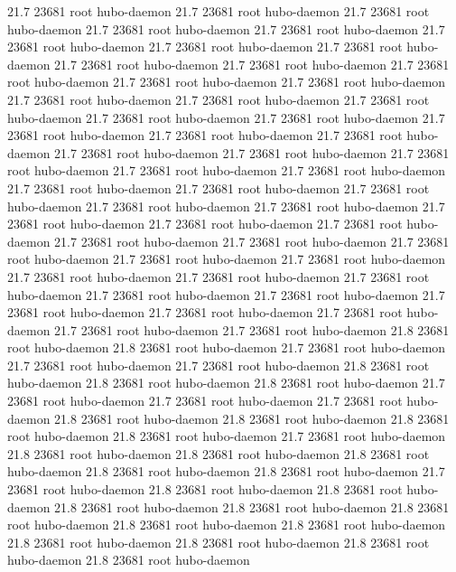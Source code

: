 21.7 23681 root     hubo-daemon
21.7 23681 root     hubo-daemon
21.7 23681 root     hubo-daemon
21.7 23681 root     hubo-daemon
21.7 23681 root     hubo-daemon
21.7 23681 root     hubo-daemon
21.7 23681 root     hubo-daemon
21.7 23681 root     hubo-daemon
21.7 23681 root     hubo-daemon
21.7 23681 root     hubo-daemon
21.7 23681 root     hubo-daemon
21.7 23681 root     hubo-daemon
21.7 23681 root     hubo-daemon
21.7 23681 root     hubo-daemon
21.7 23681 root     hubo-daemon
21.7 23681 root     hubo-daemon
21.7 23681 root     hubo-daemon
21.7 23681 root     hubo-daemon
21.7 23681 root     hubo-daemon
21.7 23681 root     hubo-daemon
21.7 23681 root     hubo-daemon
21.7 23681 root     hubo-daemon
21.7 23681 root     hubo-daemon
21.7 23681 root     hubo-daemon
21.7 23681 root     hubo-daemon
21.7 23681 root     hubo-daemon
21.7 23681 root     hubo-daemon
21.7 23681 root     hubo-daemon
21.7 23681 root     hubo-daemon
21.7 23681 root     hubo-daemon
21.7 23681 root     hubo-daemon
21.7 23681 root     hubo-daemon
21.7 23681 root     hubo-daemon
21.7 23681 root     hubo-daemon
21.7 23681 root     hubo-daemon
21.7 23681 root     hubo-daemon
21.7 23681 root     hubo-daemon
21.7 23681 root     hubo-daemon
21.7 23681 root     hubo-daemon
21.7 23681 root     hubo-daemon
21.7 23681 root     hubo-daemon
21.7 23681 root     hubo-daemon
21.7 23681 root     hubo-daemon
21.7 23681 root     hubo-daemon
21.7 23681 root     hubo-daemon
21.7 23681 root     hubo-daemon
21.7 23681 root     hubo-daemon
21.7 23681 root     hubo-daemon
21.7 23681 root     hubo-daemon
21.8 23681 root     hubo-daemon
21.8 23681 root     hubo-daemon
21.7 23681 root     hubo-daemon
21.7 23681 root     hubo-daemon
21.7 23681 root     hubo-daemon
21.8 23681 root     hubo-daemon
21.8 23681 root     hubo-daemon
21.8 23681 root     hubo-daemon
21.7 23681 root     hubo-daemon
21.7 23681 root     hubo-daemon
21.7 23681 root     hubo-daemon
21.8 23681 root     hubo-daemon
21.8 23681 root     hubo-daemon
21.8 23681 root     hubo-daemon
21.8 23681 root     hubo-daemon
21.7 23681 root     hubo-daemon
21.8 23681 root     hubo-daemon
21.8 23681 root     hubo-daemon
21.8 23681 root     hubo-daemon
21.8 23681 root     hubo-daemon
21.8 23681 root     hubo-daemon
21.7 23681 root     hubo-daemon
21.8 23681 root     hubo-daemon
21.8 23681 root     hubo-daemon
21.8 23681 root     hubo-daemon
21.8 23681 root     hubo-daemon
21.8 23681 root     hubo-daemon
21.8 23681 root     hubo-daemon
21.8 23681 root     hubo-daemon
21.8 23681 root     hubo-daemon
21.8 23681 root     hubo-daemon
21.8 23681 root     hubo-daemon
21.8 23681 root     hubo-daemon

